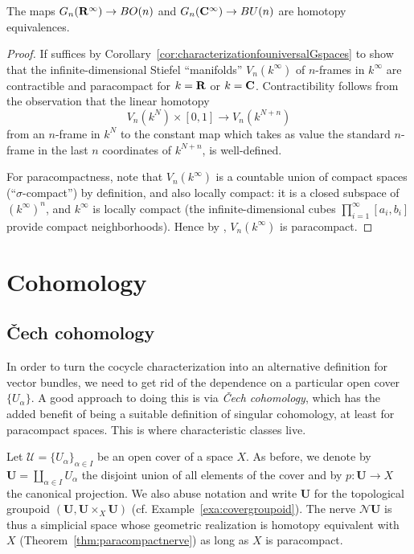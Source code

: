 \documentclass[a4paper,openany]{scrbook}
\newcommand{\nerve}{\mathcal N}
\begin{document}
\begin{corollary}
The maps $G_n(\mathbf R^\infty) \to BO(n)$ and $G_n(\mathbf C^\infty) \to BU(n)$ are homotopy equivalences.
\end{corollary}
\begin{proof}
If suffices by Corollary~\ref{cor:characterizationfouniversalGspaces} to show that the infinite-dimensional Stiefel ``manifolds'' $V_n(k^\infty)$ of $n$-frames in $k^\infty$ are contractible and paracompact for $k=\mathbf R$ or $k=\mathbf C$. Contractibility follows from the observation that the linear homotopy
\[
V_n(k^N)\times [0,1] \to V_n(k^{N+n})
\]
from an $n$-frame in $k^N$ to the constant map which takes as value the standard $n$-frame in the last $n$ coordinates of $k^{N+n}$, is well-defined. 

For paracompactness, note that $V_n(k^\infty)$ is a countable union of compact spaces (``$\sigma$-compact'') by definition, and also locally compact: it is a closed subspace of $(k^\infty)^n$, and $k^\infty$ is locally compact (the infinite-dimensional cubes $\prod_{i=1}^\infty [a_i,b_i]$ provide compact neighborhoods). Hence by \cite[Thm.~I.12.11]{bredon:topology-geometry}, $V_n(k^\infty)$ is paracompact.
\end{proof}

\chapter{Cohomology} \label{ch:cohomology}

\section{Čech cohomology}\label{sec:cechcohomology}

In order to turn the cocycle characterization into an alternative definition for vector bundles, we need to get rid of the dependence on a particular open cover $\{U_\alpha\}$. A good approach to doing this is via \emph{Čech cohomology}, which has the added benefit of being a suitable definition of singular cohomology, at least for paracompact spaces. This is where characteristic classes live.

Let $\mathcal U = \{U_\alpha\}_{\alpha \in I}$ be an open cover of a space $X$. As before, we denote by $\mathbf U = \coprod_{\alpha \in I} U_{\alpha}$ the disjoint union of all elements of the cover and by $p\colon \mathbf U \to X$ the canonical projection. We also abuse notation and write $\mathbf U$ for the topological groupoid $(\mathbf U, \mathbf U \times_X \mathbf U)$ (cf. Example~\ref{exa:covergroupoid}). The nerve $\nerve\mathbf U$ is thus a simplicial space whose geometric realization is homotopy equivalent with $X$ (Theorem~\ref{thm:paracompactnerve}) as long as $X$ is paracompact.
\end{document}
